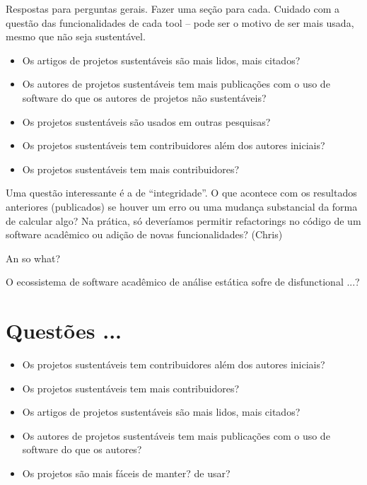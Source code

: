 \label{discussao}

Respostas para perguntas gerais. Fazer uma seção para cada.
Cuidado com a questão das funcionalidades de cada tool -- pode ser o motivo de ser mais usada,
mesmo que não seja sustentável.

\begin{itemize}
  \item Os artigos de projetos sustentáveis são mais lidos, mais citados?
  \item Os autores de projetos sustentáveis tem mais publicações 
com o uso de software do que os autores de projetos não sustentáveis?
  \item Os projetos sustentáveis são usados em outras pesquisas?
  \item Os projetos sustentáveis tem contribuidores além dos autores iniciais?
  \item Os projetos sustentáveis tem mais contribuidores?
\end{itemize}

Uma questão interessante é a de ``integridade''. 
O que acontece com os resultados anteriores (publicados)
se houver um erro ou uma mudança substancial da forma de calcular algo?
Na prática, só deveríamos permitir refactorings no código 
de um software acadêmico ou adição de novas funcionalidades?
(Chris)

An so what?

O ecossistema de software acadêmico de análise estática sofre de disfunctional ...?


\section{Questões ...} 

\begin{itemize}

  \item Os projetos sustentáveis tem contribuidores além dos autores iniciais?
  \item Os projetos sustentáveis tem mais contribuidores?
  \item Os artigos de projetos sustentáveis são mais lidos, mais citados?
  \item Os autores de projetos sustentáveis tem mais publicações com o uso de software do que os autores?
  \item Os projetos são mais fáceis de manter?  de usar?
\end{itemize}


